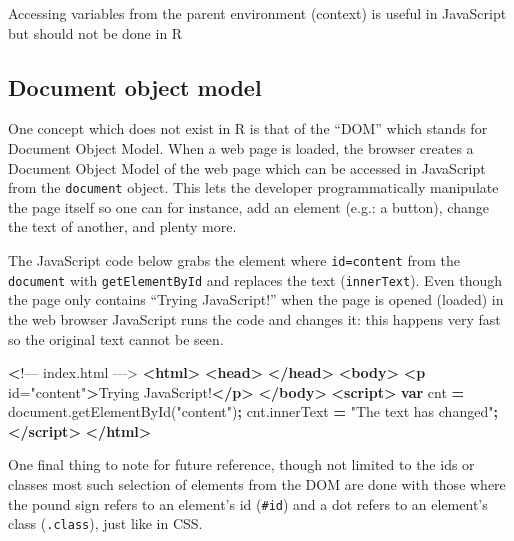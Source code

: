 \documentclass[
]{krantz}
\makeatletter
\newenvironment{Shaded}{\begin{snugshade}}{\end{snugshade}}
\newcommand{\AttributeTok}[1]{\textcolor[rgb]{0.61,0.61,0.61}{#1}}
\newcommand{\ErrorTok}[1]{\textcolor[rgb]{0.14,0.14,0.14}{\textbf{#1}}}
\newcommand{\KeywordTok}[1]{\textcolor[rgb]{0.27,0.27,0.27}{\textbf{#1}}}
\newcommand{\NormalTok}[1]{#1}
\newcommand{\OperatorTok}[1]{\textcolor[rgb]{0.43,0.43,0.43}{\textbf{#1}}}
\newcommand{\OtherTok}[1]{\textcolor[rgb]{0.37,0.37,0.37}{#1}}
\newcommand{\StringTok}[1]{\textcolor[rgb]{0.5,0.5,0.5}{#1}}
\newcommand{\VariableTok}[1]{\textcolor[rgb]{0,0,0}{#1}}
\newenvironment{kframe}{%
\medskip{}
\setlength{\fboxsep}{.8em}
 \def\at@end@of@kframe{}%
 \ifinner\ifhmode%
  \def\at@end@of@kframe{\end{minipage}}%
  \begin{minipage}{\columnwidth}%
 \fi\fi%
 \def\FrameCommand##1{\hskip\@totalleftmargin \hskip-\fboxsep
 \colorbox{shadecolor}{##1}\hskip-\fboxsep
     \hskip-\linewidth \hskip-\@totalleftmargin \hskip\columnwidth}%
 \MakeFramed {\advance\hsize-\width
   \@totalleftmargin\z@ \linewidth\hsize
   \@setminipage}}%
 {\par\unskip\endMakeFramed%
 \at@end@of@kframe}
\renewenvironment{Shaded}{\begin{kframe}}{\end{kframe}}
\newenvironment{rmdblock}[1]
  {
  \begin{itemize}
  \renewcommand{\labelitemi}{
    \raisebox{-.7\height}[0pt][0pt]{
      {\setkeys{Gin}{width=3em,keepaspectratio}\texttt{[image: images/\#1]}}
    }
  }
  \setlength{\fboxsep}{1em}
  \begin{kframe}
  \item
  }
  {
  \end{kframe}
  \end{itemize}
  }
\newenvironment{rmdnote}
  {\begin{rmdblock}{note}}
  {\end{rmdblock}}
\makeatother
\begin{document}
\begin{rmdnote}
Accessing variables from the parent environment (context) is useful in
JavaScript but should not be done in R
\end{rmdnote}

\hypertarget{document-object-model}{%
\subsection{Document object model}\label{document-object-model}}

One concept which does not exist in R is that of the ``DOM'' which stands for Document Object Model. When a web page is loaded, the browser creates a Document Object Model of the web page which can be accessed in JavaScript from the \texttt{document} object. This lets the developer programmatically manipulate the page itself so one can for instance, add an element (e.g.: a button), change the text of another, and plenty more.

The JavaScript code below grabs the element where \texttt{id=\textquotesingle{}content\textquotesingle{}} from the \texttt{document} with \texttt{getElementById} and replaces the text (\texttt{innerText}). Even though the page only contains ``Trying JavaScript!'' when the page is opened (loaded) in the web browser JavaScript runs the code and changes it: this happens very fast so the original text cannot be seen.

\begin{Shaded}
\begin{Highlighting}[]
 \ErrorTok{<}\NormalTok{!–– index.html ––>}
\KeywordTok{<html>}
  \KeywordTok{<head>}
  \KeywordTok{</head>}
  \KeywordTok{<body>}
    \KeywordTok{<p}\OtherTok{ id=}\StringTok{"content"}\KeywordTok{>}\NormalTok{Trying JavaScript!}\KeywordTok{</p>}
  \KeywordTok{</body>}
  \KeywordTok{<script>}
    \KeywordTok{var}\NormalTok{ cnt }\OperatorTok{=} \VariableTok{document}\NormalTok{.}\AttributeTok{getElementById}\NormalTok{(}\StringTok{"content"}\NormalTok{)}\OperatorTok{;}
    \VariableTok{cnt}\NormalTok{.}\AttributeTok{innerText} \OperatorTok{=} \StringTok{"The text has changed"}\OperatorTok{;}
  \KeywordTok{</script>}
\KeywordTok{</html>}
\end{Highlighting}
\end{Shaded}

One final thing to note for future reference, though not limited to the ids or classes most such selection of elements from the DOM are done with those where the pound sign refers to an element's id (\texttt{\#id}) and a dot refers to an element's class (\texttt{.class}), just like in CSS.
\end{document}
